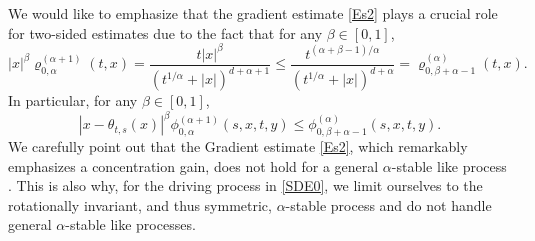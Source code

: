 \begin{remark}\rm \label{IMP_REM}
We would like to emphasize that the gradient estimate \eqref{Es2} plays a crucial role for two-sided estimates due to the fact
that for any $\beta\in[0,1]$,
\[
|x|^\beta\varrho^{(\alpha+1)}_{0,\alpha}(t,x)=\frac{t|x|^\beta}{(t^{1/\alpha}+|x|)^{d+\alpha+1}}
\leq\frac{t^{(\alpha+\beta-1)/\alpha}}{(t^{1/\alpha}+|x|)^{d+\alpha}}=\varrho^{(\alpha)}_{0,\beta+\alpha-1}(t,x).
\]
In particular, for any $\beta\in[0,1]$,
\begin{equation}\label{AA1}
|x-\theta_{t,s}(x)|^\beta\phi^{(\alpha+1)}_{0,\alpha}(s,x,t,y)
\leq\phi^{(\alpha)}_{0,\beta+\alpha-1}(s,x,t,y).
\end{equation}
We carefully point out that the Gradient estimate \eqref{Es2}, which remarkably emphasizes a concentration gain, does not hold for a general $\alpha$-stable like process \cite{DZ}. This is also why, for the driving process in \eqref{SDE0}, we limit
ourselves to the rotationally invariant, and thus symmetric,
$\alpha$-stable process and do not handle general $\alpha$-stable like processes.
\end{remark}

